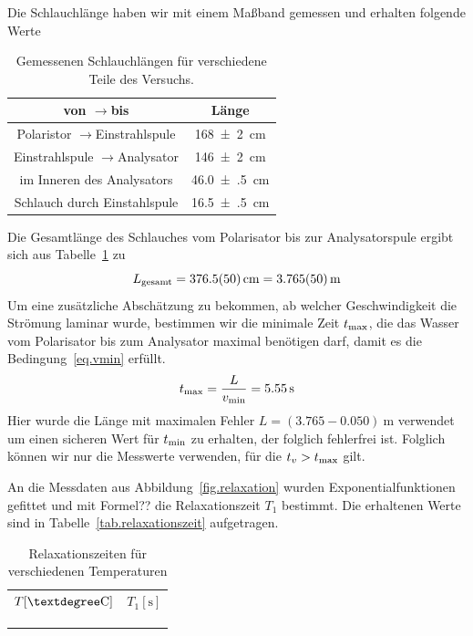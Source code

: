 \documentclass[paper=a4,
	fontsize=10pt,
	DIV=18,
	twocolumn,
	parskip=half
	]{scrartcl}
\numberwithin{equation}{section}    %
\newcommand{\tra}{$\rightarrow$}
\newcommand{\note}[1]{{\color{red}#1??}}
\begin{document}
Die Schlauchlänge haben wir mit einem Maßband gemessen und erhalten folgende Werte

\begin{table}[htp]
	\begin{center}
	\begin{tabular}{cc}
		\hline
		von \tra bis & Länge \\
		\hline
		Polaristor \tra Einstrahlspule & \SI{168(2)}{\centi\meter}\\
		Einstrahlspule \tra Analysator & \SI{146(2)}{\centi\meter}\\
		im Inneren des Analysators & \SI{46.0(5)}{\centi\meter}\\
		Schlauch durch Einstahlspule & \SI{16.5(5)}{\centi\meter}
	\end{tabular}
	\caption{Gemessenen Schlauchlängen für verschiedene Teile des Versuchs.}
	\label{tab.schlauch}
	\end{center}
\end{table}

Die Gesamtlänge des Schlauches vom Polarisator bis zur Analysatorspule ergibt sich aus Tabelle~\ref{tab.schlauch} zu 
\begin{equation}
	L_{\rm gesamt} = \SI{376.5(50)}{\centi\meter} = \SI{3.765(50)}{\meter}
\end{equation}
Um eine zusätzliche Abschätzung zu bekommen, ab welcher Geschwindigkeit die Strömung laminar wurde, bestimmen wir die minimale Zeit $t_{\rm max}$, die das Wasser vom Polarisator bis zum Analysator maximal benötigen darf, damit es die Bedingung~\eqref{eq.vmin} erfüllt.
\begin{equation}
	t_{\rm max} = \frac{L}{v_{\rm min}} = \SI{5.55}{\second}
\end{equation}
Hier wurde die Länge mit maximalen Fehler $L = (3.765-0.050)\SI{}{\meter}$ verwendet um einen sicheren Wert für $t_{\rm min}$ zu erhalten, der folglich fehlerfrei ist. Folglich können wir nur die Messwerte verwenden, für die $t_v>t_{\rm max}$ gilt.

An die Messdaten aus Abbildung~\ref{fig.relaxation} wurden Exponentialfunktionen gefittet und mit \note{Formel} die Relaxationszeit $T_1$ bestimmt. Die erhaltenen Werte sind in Tabelle~\ref{tab.relaxationszeit} aufgetragen.

\begin{table}
	\begin{center}
	\begin{tabular}{cc}
		\hline
		$T[\textdegree\mathrm{C}]$ & $T_1[\mathrm{s}]$\\
		&\\
		&\\
		&\\
		\hline
	\end{tabular}
	\caption{Relaxationszeiten für verschiedenen Temperaturen}
	\label{tab.relaxationszeiten}
	\end{center}
\end{table}
\end{document}
